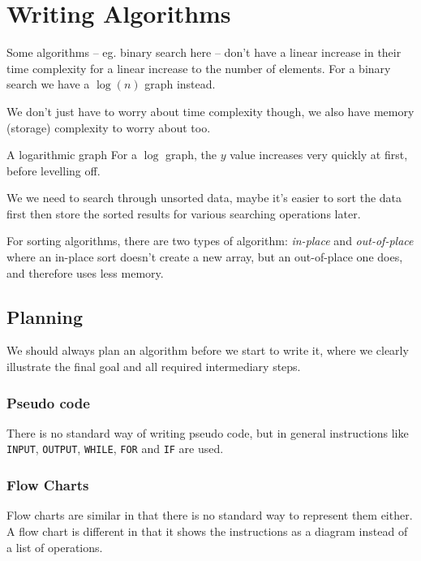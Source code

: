 \section{Writing Algorithms}\label{sec:writing_algorithms}

Some algorithms -- eg. binary search here -- don't have a linear increase in their time complexity for a linear increase to the number of elements.
For a binary search we have a \(\log(n)\) graph instead.

We don't just have to worry about time complexity though, we also have memory (storage) complexity to worry about too.

\begin{highlight}{A logarithmic graph}
    For a \(\log\) graph, the \(y\) value increases very quickly at first, before levelling off.
\end{highlight}

We we need to search through unsorted data, maybe it's easier to sort the data first then store the sorted results for various searching operations later.

For sorting algorithms, there are two types of algorithm: \emph{in-place} and \emph{out-of-place} where an in-place sort doesn't create a new array, but an out-of-place one does, and therefore uses less memory.

\subsection{Planning}\label{sub:planning}

We should always plan an algorithm before we start to write it, where we clearly illustrate the final goal and all required intermediary steps.

\subsubsection{Pseudo code}\label{ssub:pseudocode}

There is no standard way of writing pseudo code, but in general instructions like \texttt{INPUT}, \texttt{OUTPUT}, \texttt{WHILE}, \texttt{FOR} and \texttt{IF} are used.

\subsubsection{Flow Charts}\label{ssub:flow_charts}

Flow charts are similar in that there is no standard way to represent them either.
A flow chart is different in that it shows the instructions as a diagram instead of a list of operations.

